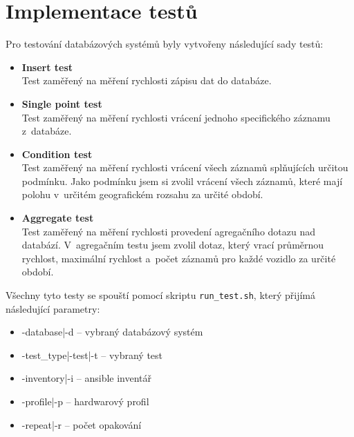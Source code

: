 \section{Implementace testů}\label{sec:test_implementation}
Pro testování databázových systémů byly vytvořeny následující sady testů:
\begin{itemize}
    \item \textbf{Insert test} \\
    Test zaměřený na měření rychlosti zápisu dat do databáze.
    \item \textbf{Single point test} \\
    Test zaměřený na měření rychlosti vrácení jednoho specifického záznamu z~databáze.
    \item \textbf{Condition test} \\
    Test zaměřený na měření rychlosti vrácení všech záznamů splňujících určitou podmínku.
    Jako podmínku jsem si zvolil vrácení všech záznamů, které mají polohu v~určitém geografickém rozsahu za určité období.
    \item \textbf{Aggregate test} \\
    Test zaměřený na měření rychlosti provedení agregačního dotazu nad databází.
    V~agregačním testu jsem zvolil dotaz, který vrací průměrnou rychlost, maximální rychlost a~počet záznamů pro každé vozidlo za určité období.
\end{itemize}
Všechny tyto testy se spouští pomocí skriptu \texttt{run\_test.sh}, který přijímá následující parametry: 
\begin{itemize}
    \item -database|-d -- vybraný databázový systém
    \item -test\_type|-test|-t -- vybraný test
    \item -inventory|-i -- ansible inventář
    \item -profile|-p -- hardwarový profil
    \item -repeat|-r -- počet opakování
\end{itemize}

